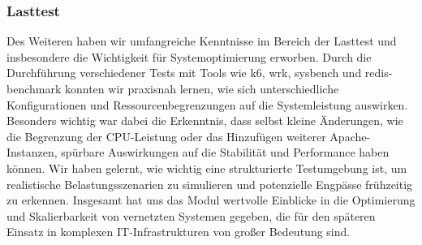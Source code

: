 \subsubsection{Lasttest}
Des Weiteren haben wir umfangreiche Kenntnisse im Bereich der Lasttest und insbesondere die Wichtigkeit für Systemoptimierung erworben. Durch die Durchführung verschiedener Tests mit Tools wie k6, wrk, sysbench und redis-benchmark konnten wir praxisnah lernen, wie sich unterschiedliche Konfigurationen und Ressourcenbegrenzungen auf die Systemleistung auswirken. Besonders wichtig war dabei die Erkenntnis, dass selbst kleine Änderungen, wie die Begrenzung der CPU-Leistung oder das Hinzufügen weiterer Apache-Instanzen, spürbare Auswirkungen auf die Stabilität und Performance haben können. Wir haben gelernt, wie wichtig eine strukturierte Testumgebung ist, um realistische Belastungsszenarien zu simulieren und potenzielle Engpässe frühzeitig zu erkennen. Insgesamt hat uns das Modul wertvolle Einblicke in die Optimierung und Skalierbarkeit von vernetzten Systemen gegeben, die für den späteren Einsatz in komplexen IT-Infrastrukturen von großer Bedeutung sind.
